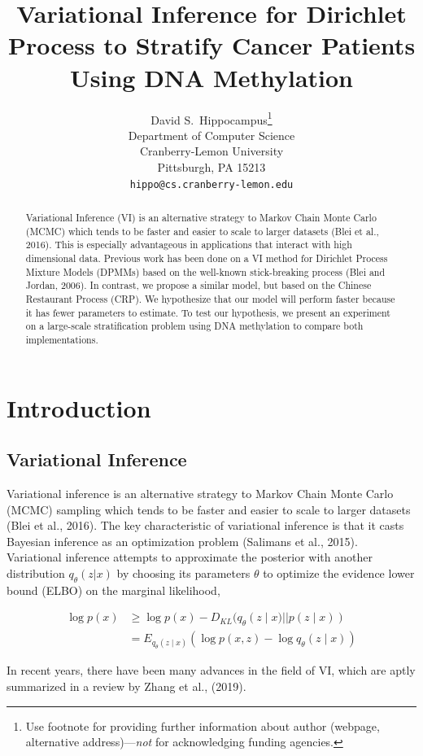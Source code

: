 \documentclass{article}
\title{Variational Inference for Dirichlet Process to Stratify Cancer
Patients Using DNA Methylation}
\author{%
  David S.~Hippocampus\thanks{Use footnote for providing further information
    about author (webpage, alternative address)---\emph{not} for acknowledging
    funding agencies.} \\
  Department of Computer Science\\
  Cranberry-Lemon University\\
  Pittsburgh, PA 15213 \\
  \texttt{hippo@cs.cranberry-lemon.edu} \\
}
\def\cond{\; | \;}
\begin{document}
\maketitle

\begin{abstract}
Variational Inference (VI) is an alternative strategy to Markov Chain Monte Carlo (MCMC) which tends to be faster and easier to scale to larger datasets (Blei et al., 2016). This is especially advantageous in applications that interact with high dimensional data. Previous work has been done on a VI method for Dirichlet Process Mixture Models (DPMMs) based on the well-known stick-breaking process (Blei and Jordan, 2006). In contrast, we propose a similar model, but based on the Chinese Restaurant Process (CRP). We hypothesize that our model will perform faster because it has fewer parameters to estimate. To test our hypothesis, we present an experiment on a large-scale stratification problem using DNA methylation to compare both implementations.
\end{abstract}

\section{Introduction}

\subsection{Variational Inference}

Variational inference is an alternative strategy to Markov Chain Monte Carlo (MCMC) sampling which tends to be faster and easier to scale to larger datasets (Blei et al., 2016). The key characteristic of variational inference is that it casts Bayesian inference as an optimization problem (Salimans et al., 2015). Variational inference attempts to approximate the posterior with another distribution $q_\theta(z|x)$ by choosing its parameters $\theta$ to optimize the evidence lower bound (ELBO) on the marginal likelihood,

\begin{align*}
\log{p(x)} &\geq \log p(x) - D_{KL}(q_\theta(z\cond x)||p(z\cond x))\\
		   &= E_{q_\theta(z\cond x)}(\log p(x,z)-\log q_\theta (z\cond x))
\end{align*}

In recent years, there have been many advances in the field of VI, which are aptly summarized in a review by Zhang et al., (2019).
\end{document}
